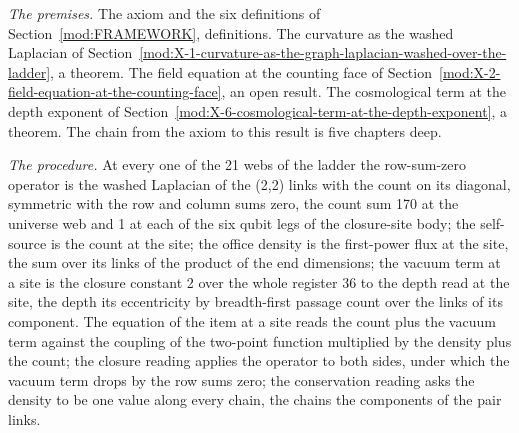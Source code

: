 \begin{chproof}
\textit{The premises.} The axiom and the six definitions of Section~\ref{mod:FRAMEWORK}, definitions. The curvature as the washed Laplacian of Section~\ref{mod:X-1-curvature-as-the-graph-laplacian-washed-over-the-ladder}, a theorem. The field equation at the counting face of Section~\ref{mod:X-2-field-equation-at-the-counting-face}, an open result. The cosmological term at the depth exponent of Section~\ref{mod:X-6-cosmological-term-at-the-depth-exponent}, a theorem. The chain from the axiom to this result is five chapters deep.

\textit{The procedure.} At every one of the 21 webs of the ladder the row-sum-zero operator is the washed Laplacian of the (2,2) links with the count on its diagonal, symmetric with the row and column sums zero, the count sum 170 at the universe web and 1 at each of the six qubit legs of the closure-site body; the self-source is the count at the site; the office density is the first-power flux at the site, the sum over its links of the product of the end dimensions; the vacuum term at a site is the closure constant 2 over the whole register 36 to the depth read at the site, the depth its eccentricity by breadth-first passage count over the links of its component. The equation of the item at a site reads the count plus the vacuum term against the coupling of the two-point function multiplied by the density plus the count; the closure reading applies the operator to both sides, under which the vacuum term drops by the row sums zero; the conservation reading asks the density to be one value along every chain, the chains the components of the pair links.


\end{chproof}
